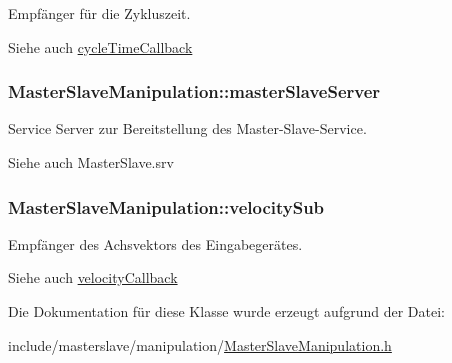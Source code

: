Empfänger für die Zykluszeit. 

\begin{DoxySeeAlso}{Siehe auch}
\hyperlink{classMasterSlaveManipulation_a3030f547b0e41511315948b020912230}{cycle\-Time\-Callback} 
\end{DoxySeeAlso}
\hypertarget{classMasterSlaveManipulation_ad9ecf87702f7a462130fdb48fe3e8df2}{
\subsubsection[{master\-Slave\-Server}]{\setlength{\rightskip}{0pt plus 5cm}Master\-Slave\-Manipulation\-::master\-Slave\-Server\hspace{0.3cm}{\ttfamily [private]}}}\label{classMasterSlaveManipulation_ad9ecf87702f7a462130fdb48fe3e8df2}


Service Server zur Bereitstellung des Master-\/\-Slave-\/\-Service. 

\begin{DoxySeeAlso}{Siehe auch}
Master\-Slave.\-srv 
\end{DoxySeeAlso}
\hypertarget{classMasterSlaveManipulation_ab7809d9d1d1b96530ca9aec2d10a0fab}{
\subsubsection[{velocity\-Sub}]{\setlength{\rightskip}{0pt plus 5cm}Master\-Slave\-Manipulation\-::velocity\-Sub\hspace{0.3cm}{\ttfamily [private]}}}\label{classMasterSlaveManipulation_ab7809d9d1d1b96530ca9aec2d10a0fab}


Empfänger des Achsvektors des Eingabegerätes. 

\begin{DoxySeeAlso}{Siehe auch}
\hyperlink{classMasterSlaveManipulation_adfd18bc0bb7cdd93586aca7aaea2c696}{velocity\-Callback} 
\end{DoxySeeAlso}


Die Dokumentation für diese Klasse wurde erzeugt aufgrund der Datei\-:\begin{DoxyCompactItemize}
\item 
include/masterslave/manipulation/\hyperlink{MasterSlaveManipulation_8h}{Master\-Slave\-Manipulation.\-h}\end{DoxyCompactItemize}
